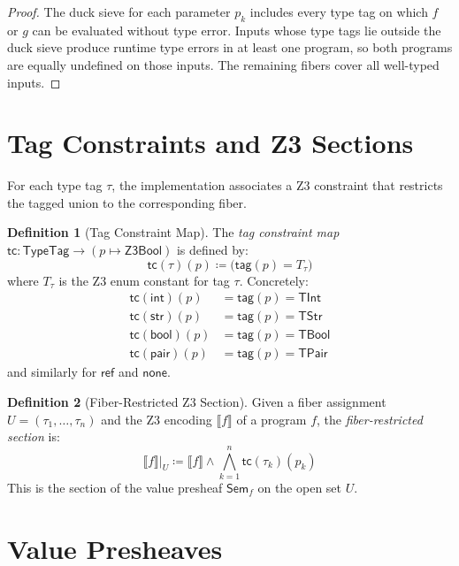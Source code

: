 \documentclass[11pt,a4paper]{report}
\theoremstyle{definition}
\newtheorem{definition}{Definition}[chapter]
\theoremstyle{plain}
\newcommand{\den}[1]{\llbracket #1 \rrbracket}
\newcommand{\Sem}{\mathsf{Sem}}
\begin{document}
\begin{proof}
The duck sieve for each parameter $p_k$ includes every type tag
on which $f$ or $g$ can be evaluated without type error.  Inputs
whose type tags lie outside the duck sieve produce runtime type
errors in at least one program, so both programs are equally
undefined on those inputs.  The remaining fibers cover all
well-typed inputs.
\end{proof}

\section{Tag Constraints and Z3 Sections}

For each type tag $\tau$, the implementation associates a Z3 constraint
that restricts the tagged union to the corresponding fiber.

\begin{definition}[Tag Constraint Map]
\label{def:tag-constraint}
The \emph{tag constraint map}
$\mathsf{tc} : \mathsf{TypeTag} \to (p \mapsto \mathsf{Z3Bool})$
is defined by:
\[
  \mathsf{tc}(\tau)(p) \coloneqq \bigl(\mathsf{tag}(p) = T_\tau\bigr)
\]
where $T_\tau$ is the Z3 enum constant for tag $\tau$.  Concretely:
\begin{align}
  \mathsf{tc}(\mathsf{int})(p) &= \mathsf{tag}(p) = \mathsf{TInt} \\
  \mathsf{tc}(\mathsf{str})(p) &= \mathsf{tag}(p) = \mathsf{TStr} \\
  \mathsf{tc}(\mathsf{bool})(p) &= \mathsf{tag}(p) = \mathsf{TBool} \\
  \mathsf{tc}(\mathsf{pair})(p) &= \mathsf{tag}(p) = \mathsf{TPair}
\end{align}
and similarly for $\mathsf{ref}$ and $\mathsf{none}$.
\end{definition}

\begin{definition}[Fiber-Restricted Z3 Section]
\label{def:z3-section}
Given a fiber assignment $U = (\tau_1, \ldots, \tau_n)$ and the
Z3 encoding $\den{f}$ of a program $f$, the \emph{fiber-restricted
section} is:
\[
  \den{f}|_U \coloneqq \den{f} \wedge
    \bigwedge_{k=1}^{n} \mathsf{tc}(\tau_k)(p_k)
\]
This is the section of the value presheaf $\Sem_f$ on the open set $U$.
\end{definition}

\section{Value Presheaves}
\end{document}
